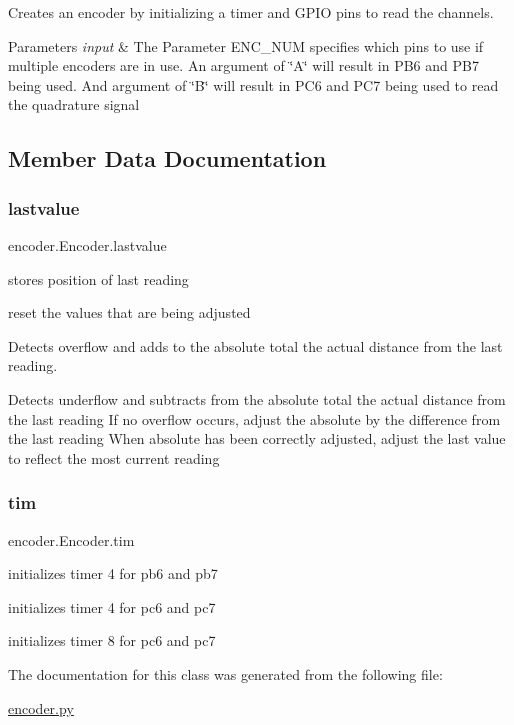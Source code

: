 Creates an encoder by initializing a timer and G\+P\+IO pins to read the channels. 


\begin{DoxyParams}{Parameters}
{\em input} & The Parameter E\+N\+C\+\_\+\+N\+UM specifies which pins to use if multiple encoders are in use. An argument of \char`\"{}\+A\char`\"{} will result in P\+B6 and P\+B7 being used. And argument of \char`\"{}\+B\char`\"{} will result in P\+C6 and P\+C7 being used to read the quadrature signal \\
\hline
\end{DoxyParams}


\subsection{Member Data Documentation}
\mbox{\label{classencoder_1_1_encoder_ac25b53365fa6489ddaa4417db58619de}} 
\subsubsection{\texorpdfstring{lastvalue}{lastvalue}}
{\footnotesize\ttfamily encoder.\+Encoder.\+lastvalue}



stores position of last reading 

reset the values that are being adjusted

Detects overflow and adds to the absolute total the actual distance from the last reading.

Detects underflow and subtracts from the absolute total the actual distance from the last reading If no overflow occurs, adjust the absolute by the difference from the last reading When absolute has been correctly adjusted, adjust the last value to reflect the most current reading \mbox{\label{classencoder_1_1_encoder_a6d34277d78f0f528aeb8b4d8901356b7}} 
\subsubsection{\texorpdfstring{tim}{tim}}
{\footnotesize\ttfamily encoder.\+Encoder.\+tim}



initializes timer 4 for pb6 and pb7 

initializes timer 4 for pc6 and pc7

initializes timer 8 for pc6 and pc7 

The documentation for this class was generated from the following file\+:\begin{DoxyCompactItemize}
\item 
\mbox{\hyperlink{encoder_8py}{encoder.\+py}}\end{DoxyCompactItemize}
